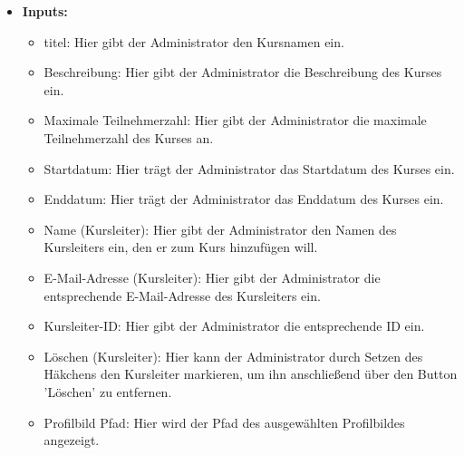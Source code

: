 \begin{itemize}
				
			\item \textbf{Inputs:}
				\begin{itemize}
					\item titel: Hier gibt der Administrator den Kursnamen ein.
					\item Beschreibung: Hier gibt der Administrator die Beschreibung des Kurses ein.
					\item Maximale Teilnehmerzahl: Hier gibt der Administrator die maximale Teilnehmerzahl des Kurses an.
					\item Startdatum: Hier trägt der Administrator das Startdatum des Kurses ein.
					\item Enddatum: Hier trägt der Administrator das Enddatum des Kurses ein.
					\item Name (Kursleiter): Hier gibt der Administrator den Namen des Kursleiters ein, den er zum Kurs hinzufügen will.
					\item E-Mail-Adresse (Kursleiter): Hier gibt der Administrator die entsprechende E-Mail-Adresse des Kursleiters ein.
					\item Kursleiter-ID: Hier gibt der Administrator die entsprechende ID ein.
					\item Löschen (Kursleiter): Hier kann der Administrator durch Setzen des Häkchens den Kursleiter markieren, um ihn anschließend über den Button 'Löschen' zu entfernen.
					\item Profilbild Pfad: Hier wird der Pfad des ausgewählten Profilbildes angezeigt.
					
				\end{itemize}
				
				\begin{center}
					\begin{longtable}{|p{3cm} |p{5cm} | p{4cm}|p{3cm}|}
						

\end{longtable}
\end{center}
\end{itemize}

